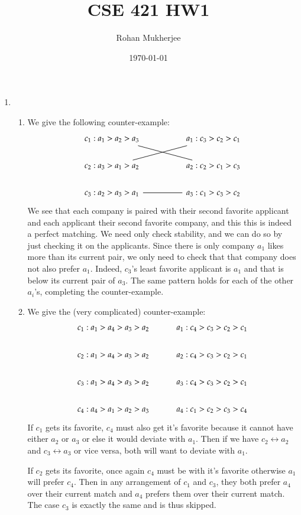 \documentclass[12pt]{article}
\title{CSE 421 HW1}
\date{\today}
\author{Rohan Mukherjee}
\theoremstyle{definitionstyle}
\begin{document}
	\maketitle
	\begin{enumerate}[leftmargin=\labelsep]
		\item \begin{enumerate}
			\item We give the following counter-example:
			\[\begin{tikzcd}
				{c_1: a_1>a_2>a_3} && {a_1: c_3 > c_2 > c_1 } \\
				{c_2: a_3 > a_1 > a_2 } && {a_2: c_2 > c_1 > c_3 } \\
				{c_3: a_2 > a_3 > a_1 } && {a_3: c_1 > c_3 > c_2 }
				\arrow[no head, from=1-1, to=2-3]
				\arrow[no head, from=2-1, to=1-3]
				\arrow[no head, from=3-1, to=3-3]
			\end{tikzcd}\]
			We see that each company is paired with their second favorite applicant and each applicant their second favorite company, and this this is indeed a perfect matching. We need only check stability, and we can do so by just checking it on the applicants. Since there is only company $a_1$ likes more than its current pair, we only need to check that that company does not also prefer $a_1$. Indeed, $c_3$'s least favorite applicant is $a_1$ and that is below its current pair of $a_3$. The same pattern holds for each of the other $a_i$'s, completing the counter-example.
			
			\item We give the (very complicated) counter-example:
			\[\begin{tikzcd}
				{c_1:a_1>a_4>a_3>a_2} & {a_1:c_4>c_3>c_2>c_1} \\
				{c_2:a_1>a_4>a_3>a_2} & {a_2:c_4>c_3>c_2>c_1} \\
				{c_3:a_1>a_4>a_3>a_2} & {a_3:c_4>c_3>c_2>c_1} \\
				{c_4:a_4>a_1>a_2>a_3} & {a_4:c_1>c_2>c_3>c_4}
			\end{tikzcd}\]
			If $c_1$ gets its favorite, $c_4$ must also get it's favorite because it cannot have either $a_2$ or $a_3$ or else it would deviate with $a_1$. Then if we have $c_2 \leftrightarrow a_2$ and $c_3 \leftrightarrow a_3$ or vice versa, both will want to deviate with $a_1$.
			
			If $c_2$ gets its favorite, once again $c_4$ must be with it's favorite otherwise $a_1$ will prefer $c_4$. Then in any arrangement of $c_1$ and $c_3$, they both prefer $a_4$ over their current match and $a_4$ prefers them over their current match. The case $c_3$ is exactly the same and is thus skipped.
			

\end{enumerate}
\end{enumerate}
\end{document}

